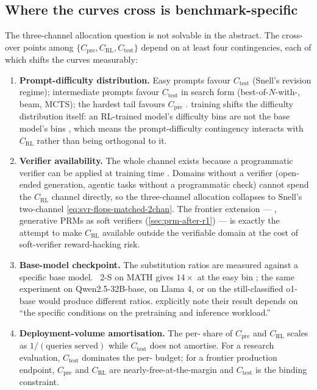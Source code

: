 \subsection{Where the curves cross is benchmark-specific}
\label{sec:svr-benchmark-specific}

The three-channel allocation question is not solvable in the abstract.
The cross-over points among $\{C_\text{pre}, C_\text{RL},
C_\text{test}\}$ depend on at least four contingencies, each of which
shifts the curves measurably:

\begin{enumerate}
\item \textbf{Prompt-difficulty distribution.} Easy prompts favour
$C_\text{test}$ (Snell's revision regime); intermediate prompts favour
$C_\text{test}$ in search form (best-of-$N$-with-, beam, MCTS); the
hardest tail favours $C_\text{pre}$ \citep[\S 6]{snell2024}. 
training shifts the difficulty distribution itself: an
RL-trained model's difficulty bins are not the base model's bins
\citep[\S 2.3]{deepseek-r1}, which means the prompt-difficulty contingency
interacts with $C_\text{RL}$ rather than being orthogonal to it.

\item \textbf{Verifier availability.} The whole  channel exists
because a programmatic verifier can be applied at training time
\citep[\S 1.1]{shao2024}. Domains without a verifier (open-ended
generation, agentic tasks without a programmatic check) cannot spend
the $C_\text{RL}$ channel directly, so the three-channel allocation
collapses to Snell's two-channel \cref{eq:svr-flops-matched-2chan}.
The frontier extension --- , generative PRMs as soft
verifiers (\cref{sec:prm-after-r1}) --- is exactly the attempt to
make $C_\text{RL}$ available outside the verifiable domain at the
cost of soft-verifier reward-hacking risk.

\item \textbf{Base-model checkpoint.} The substitution ratios are
measured against a specific base model. ~2-S\* on MATH gives
$14\times$ at the easy bin \citep[\S 6]{snell2024}; the same
experiment on Qwen2.5-32B-base, on Llama 4, or on the still-classified
o1-base would produce different ratios. \citet[\S 6]{snell2024}
explicitly note their result depends on ``the specific conditions on
the pretraining and inference workload.''

\item \textbf{Deployment-volume amortisation.} The per- share of
$C_\text{pre}$ and $C_\text{RL}$ scales as $1/(\text{queries served})$
while $C_\text{test}$ does not amortise. For a research evaluation,
$C_\text{test}$ dominates the per- budget; for a frontier
production endpoint, $C_\text{pre}$ and $C_\text{RL}$ are
nearly-free-at-the-margin and $C_\text{test}$ is the binding
constraint.
\end{enumerate}

